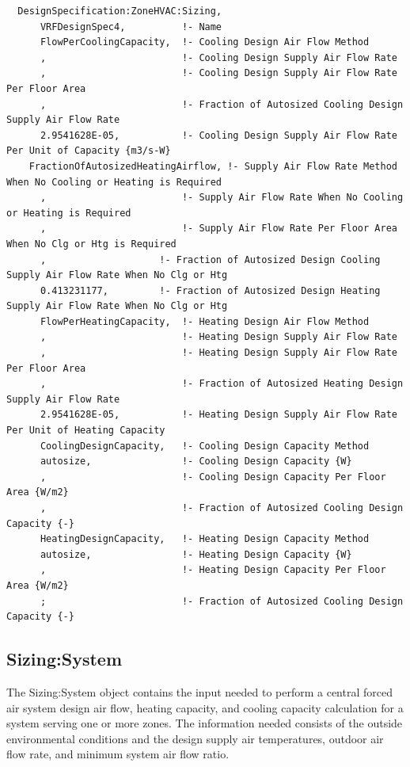 \begin{lstlisting}
  DesignSpecification:ZoneHVAC:Sizing,
      VRFDesignSpec4,          !- Name
      FlowPerCoolingCapacity,  !- Cooling Design Air Flow Method
      ,                        !- Cooling Design Supply Air Flow Rate
      ,                        !- Cooling Design Supply Air Flow Rate Per Floor Area
      ,                        !- Fraction of Autosized Cooling Design Supply Air Flow Rate
      2.9541628E-05,           !- Cooling Design Supply Air Flow Rate Per Unit of Capacity {m3/s-W}
    FractionOfAutosizedHeatingAirflow, !- Supply Air Flow Rate Method When No Cooling or Heating is Required
      ,                        !- Supply Air Flow Rate When No Cooling or Heating is Required
      ,                        !- Supply Air Flow Rate Per Floor Area When No Clg or Htg is Required
      ,                    !- Fraction of Autosized Design Cooling Supply Air Flow Rate When No Clg or Htg
      0.413231177,         !- Fraction of Autosized Design Heating Supply Air Flow Rate When No Clg or Htg
      FlowPerHeatingCapacity,  !- Heating Design Air Flow Method
      ,                        !- Heating Design Supply Air Flow Rate
      ,                        !- Heating Design Supply Air Flow Rate Per Floor Area
      ,                        !- Fraction of Autosized Heating Design Supply Air Flow Rate
      2.9541628E-05,           !- Heating Design Supply Air Flow Rate Per Unit of Heating Capacity
      CoolingDesignCapacity,   !- Cooling Design Capacity Method
      autosize,                !- Cooling Design Capacity {W}
      ,                        !- Cooling Design Capacity Per Floor Area {W/m2}
      ,                        !- Fraction of Autosized Cooling Design Capacity {-}
      HeatingDesignCapacity,   !- Heating Design Capacity Method
      autosize,                !- Heating Design Capacity {W}
      ,                        !- Heating Design Capacity Per Floor Area {W/m2}
      ;                        !- Fraction of Autosized Cooling Design Capacity {-}
\end{lstlisting}

\subsection{Sizing:System}\label{sizingsystem}

The Sizing:System object contains the input needed to perform a central forced air system design air flow, heating capacity, and cooling capacity calculation for a system serving one or more zones. The information needed consists of the outside environmental conditions and the design supply air temperatures, outdoor air flow rate, and minimum system air flow ratio.

